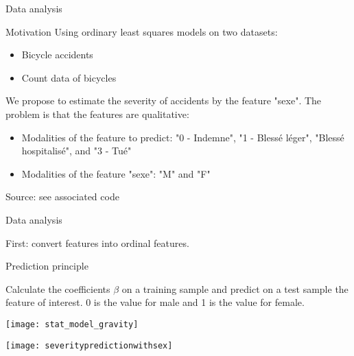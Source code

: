 \documentclass[unknownkeysallowed]{beamer}
\begin{document}
\begin{frame}{Data analysis}
\begin{exampleblock}{Motivation}
Using ordinary least squares models on two datasets:

\begin{itemize}
	\item Bicycle accidents
	\item Count data of bicycles
	\end{itemize}
\end{exampleblock}

\vspace{0.5cm}

We propose to estimate the severity of accidents by the feature "sexe". The problem is that the features are qualitative:
\begin{itemize}
    \item Modalities of the feature to predict: "0 - Indemne", "1 - Blessé léger", "Blessé hospitalisé", and "3 - Tué"
    \item Modalities of the feature "sexe": "M" and "F"
\end{itemize}
Source: see associated code %
\end{frame}


\begin{frame}{Data analysis}

First: convert features into ordinal features.

\begin{exampleblock}{Prediction principle}

Calculate the coefficients $\beta$ on a training sample and predict on a test sample the feature of interest. 0 is the value for male and 1 is the value for female.

\end{exampleblock}


\begin{minipage}[c]{.36\linewidth}
     \begin{center}
             \texttt{[image: stat\_model\_gravity]}
         \end{center}
   \end{minipage} \hfill
   \begin{minipage}[c]{.55\linewidth}
    \begin{center}
            \texttt{[image: severitypredictionwithsex]}

        \end{center}

 \end{minipage}

\end{frame}
\end{document}
